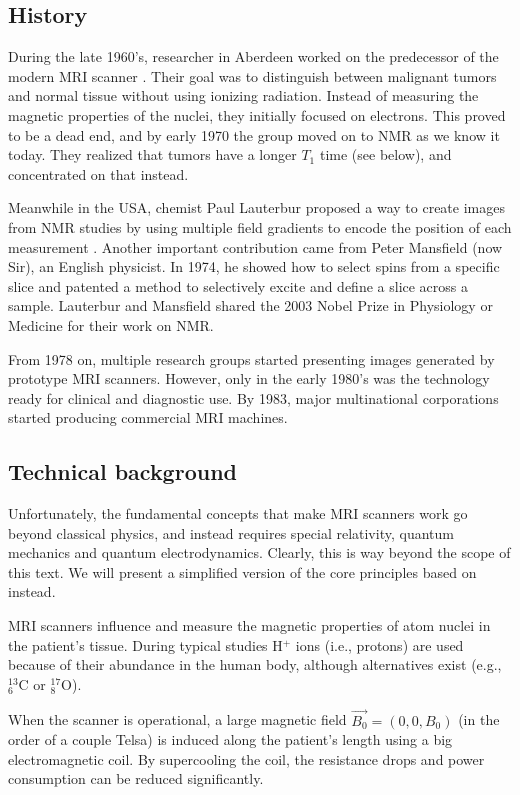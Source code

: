 \subsection{History}\label{ssec:mrihist}
During the late 1960's, researcher in Aberdeen worked on the predecessor of the
modern MRI scanner \cite{mrihistory}. Their goal was to distinguish between
malignant tumors and normal tissue without using ionizing radiation. Instead of
measuring the magnetic properties of the nuclei, they initially focused on
electrons. This proved to be a dead end, and by early 1970 the group moved on to
NMR as we know it today. They realized that tumors have a longer $T_1$ time
(see below), and concentrated on that instead.

Meanwhile in the USA, chemist Paul Lauterbur proposed a way to create images
from NMR studies by using multiple field gradients to encode the position of
each measurement \cite{lauterbur1973}. Another important contribution came from
Peter Mansfield (now Sir), an English physicist. In 1974, he showed how to
select spins from a specific slice and patented a method to selectively excite
and define a slice across a sample. Lauterbur and Mansfield shared the 2003
Nobel Prize in Physiology or Medicine for their work on NMR.

From 1978 on, multiple research groups started presenting images generated by
prototype MRI scanners. However, only in the early 1980's was the technology 
ready for clinical and diagnostic use. By 1983, major multinational corporations
started producing commercial MRI machines.

\subsection{Technical background}
Unfortunately, the fundamental concepts that make MRI scanners work go beyond
classical physics, and instead requires special relativity, quantum mechanics
and quantum electrodynamics. Clearly, this is way beyond the scope of this text. We
will present a simplified version of the core principles based on
\cite{suetens} instead.

MRI scanners influence and measure the magnetic properties of atom nuclei in the
patient's tissue. During typical studies H$^+$ ions (i.e., protons) are used
because of their abundance in the human body, although alternatives exist
(e.g., ${}^{13}_6$C or ${}^{17}_8$O).

When the scanner is operational, a large magnetic field $\vec{B_0} = (0,0,B_0)$
(in the order of a couple Telsa) is induced along the patient's length using a
big electromagnetic coil. By supercooling the coil, the resistance drops and
power consumption can be reduced significantly.

